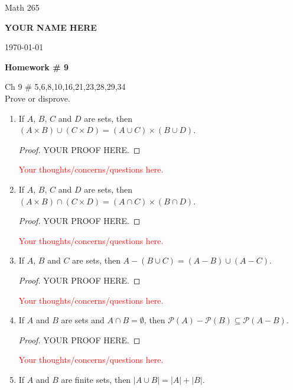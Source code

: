 \documentclass[11pt]{report}
\theoremstyle{plain}
\newcommand{\ps}{\mathscr{P}}
\begin{document}
\hfill Math 265

\hfill \textbf{YOUR NAME HERE}

\hfill \today

\begin{center}
\Large{\textbf{Homework \# 9}} \\

\end{center}

\noindent{} \quad Ch 9 \# 5,6,8,10,16,21,23,28,29,34\\

\noindent{} Prove or disprove. 

\begin{enumerate}
\item[\textbf{5.}] If $A$, $B$, $C$ and $D$ are sets, then $(A \times B) \cup (C \times D) = (A \cup C) \times (B \cup D)$.
\begin{proof} YOUR PROOF HERE.
\end{proof}
\textcolor{red}{Your thoughts/concerns/questions here.}
\vspace{1in}
\item[\textbf{6.}] If $A$, $B$, $C$ and $D$ are sets, then $(A \times B) \cap (C \times D) = (A \cap C) \times (B \cap D)$.
\begin{proof} YOUR PROOF HERE.
\end{proof}
\textcolor{red}{Your thoughts/concerns/questions here.}
\vspace{1in}
\item[\textbf{8.}] If $A$, $B$ and $C$ are sets, then $A - (B \cup C) = (A - B) \cup (A - C)$.
\begin{proof} YOUR PROOF HERE.
\end{proof}
\textcolor{red}{Your thoughts/concerns/questions here.}
\vspace{1in}
\item[\textbf{10.}] If $A$ and $B$ are sets and $A \cap B = \emptyset$, then $\ps(A) - \ps(B) \subseteq \ps(A - B)$.
\begin{proof} YOUR PROOF HERE.
\end{proof}
\textcolor{red}{Your thoughts/concerns/questions here.}
\vspace{1in}
\item[\textbf{16.}] If $A$ and $B$ are finite sets, then $|A \cup B| = |A| + |B|$.

\end{enumerate}
\end{document}
